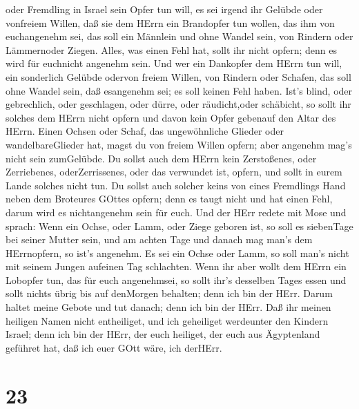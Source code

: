 oder Fremdling in Israel sein Opfer tun will, es sei irgend ihr Gelübde
oder vonfreiem Willen, daß sie dem HErrn ein Brandopfer tun wollen, das
ihm von euchangenehm sei,  das soll ein Männlein und ohne
Wandel sein, von Rindern oder Lämmernoder Ziegen.  Alles,
was einen Fehl hat, sollt ihr nicht opfern; denn es wird für euchnicht
angenehm sein.  Und wer ein Dankopfer dem HErrn tun will,
ein sonderlich Gelübde odervon freiem Willen, von Rindern oder Schafen,
das soll ohne Wandel sein, daß esangenehm sei; es soll keinen Fehl
haben.  Ist's blind, oder gebrechlich, oder geschlagen,
oder dürre, oder räudicht,oder schäbicht, so sollt ihr solches dem HErrn
nicht opfern und davon kein Opfer gebenauf den Altar des HErrn.
 Einen Ochsen oder Schaf, das ungewöhnliche Glieder oder
wandelbareGlieder hat, magst du von freiem Willen opfern; aber angenehm
mag's nicht sein zumGelübde.  Du sollst auch dem HErrn kein
Zerstoßenes, oder Zerriebenes, oderZerrissenes, oder das verwundet ist,
opfern, und sollt in eurem Lande solches nicht tun.  Du
sollst auch solcher keins von eines Fremdlings Hand neben dem Broteures
GOttes opfern; denn es taugt nicht und hat einen Fehl, darum wird es
nichtangenehm sein für euch.  Und der HErr redete mit Mose
und sprach:  Wenn ein Ochse, oder Lamm, oder Ziege geboren
ist, so soll es siebenTage bei seiner Mutter sein, und am achten Tage
und danach mag man's dem HErrnopfern, so ist's angenehm. 
Es sei ein Ochse oder Lamm, so soll man's nicht mit seinem Jungen
aufeinen Tag schlachten.  Wenn ihr aber wollt dem HErrn ein
Lobopfer tun, das für euch angenehmsei,  so sollt ihr's
desselben Tages essen und sollt nichts übrig bis auf denMorgen behalten;
denn ich bin der HErr.  Darum haltet meine Gebote und tut
danach; denn ich bin der HErr.  Daß ihr meinen heiligen
Namen nicht entheiliget, und ich geheiliget werdeunter den Kindern
Israel; denn ich bin der HErr, der euch heiliget,  der euch
aus Ägyptenland geführet hat, daß ich euer GOtt wäre, ich derHErr.

\hypertarget{section-22}{%
\section{23}\label{section-22}}

